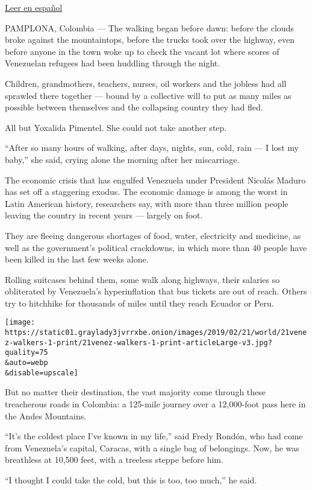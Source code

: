 \href{https://www.nytimes3xbfgragh.onion/es/2019/02/20/venezuela-migrantes-cucuta/?}{Leer
en español}

PAMPLONA, Colombia --- The walking began before dawn: before the clouds
broke against the mountaintops, before the trucks took over the highway,
even before anyone in the town woke up to check the vacant lot where
scores of Venezuelan refugees had been huddling through the night.

Children, grandmothers, teachers, nurses, oil workers and the jobless
had all sprawled there together --- bound by a collective will to put as
many miles as possible between themselves and the collapsing country
they had fled.

All but Yoxalida Pimentel. She could not take another step.

``After so many hours of walking, after days, nights, sun, cold, rain
--- I lost my baby,'' she said, crying alone the morning after her
miscarriage.

The economic crisis that has engulfed Venezuela under President Nicolás
Maduro has set off a staggering exodus. The economic damage is among the
worst in Latin American history, researchers say, with more than three
million people leaving the country in recent years --- largely on foot.

They are fleeing dangerous shortages of food, water, electricity and
medicine, as well as the government's political crackdowns, in which
more than 40 people have been killed in the last few weeks alone.

Rolling suitcases behind them, some walk along highways, their salaries
so obliterated by Venezuela's hyperinflation that bus tickets are out of
reach. Others try to hitchhike for thousands of miles until they reach
Ecuador or Peru.

\texttt{[image: https://static01.graylady3jvrrxbe.onion/images/2019/02/21/world/21venez-walkers-1-print/21venez-walkers-1-print-articleLarge-v3.jpg?quality=75\\\&auto=webp\\\&disable=upscale]}

But no matter their destination, the vast majority come through these
treacherous roads in Colombia: a 125-mile journey over a 12,000-foot
pass here in the Andes Mountains.

``It's the coldest place I've known in my life,'' said Fredy Rondón, who
had come from Venezuela's capital, Caracas, with a single bag of
belongings. Now, he was breathless at 10,500 feet, with a treeless
steppe before him.

``I thought I could take the cold, but this is too, too much,'' he said.

